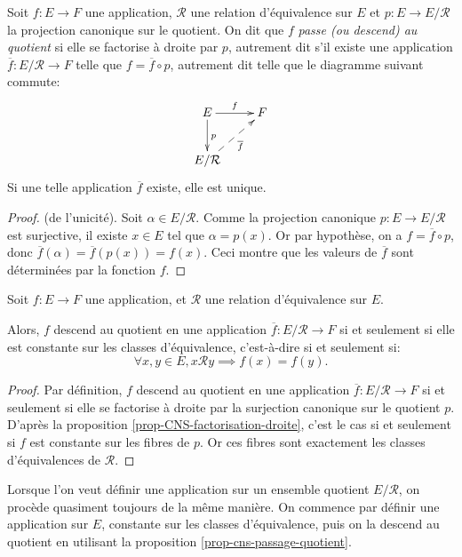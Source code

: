 \begin{propdef}
Soit $f : E\to F$ une application, $\mathcal R$ une relation d'équivalence sur $E$  et $p : E\to E/\mathcal R$ la projection canonique sur le quotient.
On dit que $f$ \emph{passe (ou descend) au quotient} si elle se factorise à droite par $p$, autrement dit s'il existe une application $\overline f : E/\mathcal R\to F$ telle que $f = \overline{f} \circ p$, autrement dit telle que le diagramme suivant commute:
\[
\xymatrix{
E \ar[r]^f \ar[d]^p & F\\
E/\mathcal R \ar@{-->}[ur]_{\overline f}& 
}
\] 
Si une telle application $\overline{f}$ existe, elle est unique.
\end{propdef}
\begin{proof}(de l'unicité). Soit $\alpha \in E/\mathcal R$. Comme la projection canonique $p : E\to E/\mathcal R$ est surjective, il existe $x\in E$ tel que $\alpha=p(x)$. Or par hypothèse, on a $f = \overline{f} \circ p$, donc $\overline f(\alpha) =\overline f(p(x))= f(x)$. Ceci montre que les valeurs de $\overline f$ sont déterminées par la fonction $f$.
\end{proof}


\begin{proposition}\label{prop-cns-passage-quotient}
Soit $f : E\to F$ une application, et $\mathcal R$ une relation d'équivalence sur $E$.

Alors, $f$ descend au quotient en une application $\overline f : E/\mathcal R \to F$ si et seulement si elle est constante sur les classes d'équivalence, c'est-à-dire si et seulement si:
\[
\forall x,y\in E, x\mathcal R y \implies f(x)=f(y).
\]
\end{proposition}

\begin{proof}
Par définition, $f$ descend au quotient en une application $\overline f : E/\mathcal R \to F$ si et seulement si elle se factorise à droite par la surjection canonique sur le quotient $p$.
D'après la proposition \ref{prop-CNS-factorisation-droite}, c'est le cas si et seulement si $f$ est constante sur les fibres de $p$.
Or ces fibres sont exactement les classes d'équivalences de $\mathcal R$.
\end{proof}

\begin{mdframed}[linewidth=2]
Lorsque l'on veut définir une application sur un ensemble quotient $E/\mathcal R$, on procède quasiment toujours de la même manière. On commence par définir une application sur  $E$, constante sur les classes d'équivalence, puis on la descend au quotient en utilisant la proposition \ref{prop-cns-passage-quotient}.
\end{mdframed}


